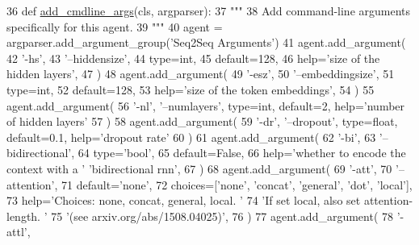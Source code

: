 \begin{DoxyCode}
36     \textcolor{keyword}{def }\hyperlink{namespaceparlai_1_1agents_1_1drqa_1_1config_a62fdd5554f1da6be0cba185271058320}{add\_cmdline\_args}(cls, argparser):
37         \textcolor{stringliteral}{"""}
38 \textcolor{stringliteral}{        Add command-line arguments specifically for this agent.}
39 \textcolor{stringliteral}{        """}
40         agent = argparser.add\_argument\_group(\textcolor{stringliteral}{'Seq2Seq Arguments'})
41         agent.add\_argument(
42             \textcolor{stringliteral}{'-hs'},
43             \textcolor{stringliteral}{'--hiddensize'},
44             type=int,
45             default=128,
46             help=\textcolor{stringliteral}{'size of the hidden layers'},
47         )
48         agent.add\_argument(
49             \textcolor{stringliteral}{'-esz'},
50             \textcolor{stringliteral}{'--embeddingsize'},
51             type=int,
52             default=128,
53             help=\textcolor{stringliteral}{'size of the token embeddings'},
54         )
55         agent.add\_argument(
56             \textcolor{stringliteral}{'-nl'}, \textcolor{stringliteral}{'--numlayers'}, type=int, default=2, help=\textcolor{stringliteral}{'number of hidden layers'}
57         )
58         agent.add\_argument(
59             \textcolor{stringliteral}{'-dr'}, \textcolor{stringliteral}{'--dropout'}, type=float, default=0.1, help=\textcolor{stringliteral}{'dropout rate'}
60         )
61         agent.add\_argument(
62             \textcolor{stringliteral}{'-bi'},
63             \textcolor{stringliteral}{'--bidirectional'},
64             type=\textcolor{stringliteral}{'bool'},
65             default=\textcolor{keyword}{False},
66             help=\textcolor{stringliteral}{'whether to encode the context with a '} \textcolor{stringliteral}{'bidirectional rnn'},
67         )
68         agent.add\_argument(
69             \textcolor{stringliteral}{'-att'},
70             \textcolor{stringliteral}{'--attention'},
71             default=\textcolor{stringliteral}{'none'},
72             choices=[\textcolor{stringliteral}{'none'}, \textcolor{stringliteral}{'concat'}, \textcolor{stringliteral}{'general'}, \textcolor{stringliteral}{'dot'}, \textcolor{stringliteral}{'local'}],
73             help=\textcolor{stringliteral}{'Choices: none, concat, general, local. '}
74             \textcolor{stringliteral}{'If set local, also set attention-length. '}
75             \textcolor{stringliteral}{'(see arxiv.org/abs/1508.04025)'},
76         )
77         agent.add\_argument(
78             \textcolor{stringliteral}{'-attl'},

\end{DoxyCode}
